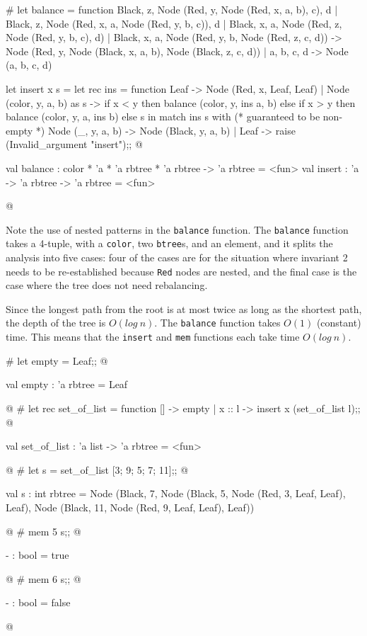 \begin{ocaml}
# let balance = function
     Black, z, Node (Red, y, Node (Red, x, a, b), c), d
   | Black, z, Node (Red, x, a, Node (Red, y, b, c)), d
   | Black, x, a, Node (Red, z, Node (Red, y, b, c), d)
   | Black, x, a, Node (Red, y, b, Node (Red, z, c, d)) ->
        Node (Red, y, Node (Black, x, a, b), Node (Black, z, c, d))
   | a, b, c, d ->
        Node (a, b, c, d)

  let insert x s =
     let rec ins = function
        Leaf -> Node (Red, x, Leaf, Leaf)
      | Node (color, y, a, b) as s ->
           if x < y then balance (color, y, ins a, b)
           else if x > y then balance (color, y, a, ins b)
           else s
     in
        match ins s with  (* guaranteed to be non-empty *)
           Node (_, y, a, b) -> Node (Black, y, a, b)
         | Leaf -> raise (Invalid_argument "insert");;
@
\begin{topoutput}
val balance : color * 'a * 'a rbtree * 'a rbtree -> 'a rbtree = <fun>
val insert : 'a -> 'a rbtree -> 'a rbtree = <fun>
\end{topoutput}
@
\end{ocaml}
\label{page:ref-black-insert}
%
Note the use of nested patterns in the \hbox{\lstinline/balance/} function.  The
\hbox{\lstinline/balance/} function takes a 4-tuple, with a \hbox{\lstinline/color/}, two
\hbox{\lstinline/btree/}s, and an element, and it splits the analysis into five
cases: four of the cases are for the situation where invariant 2 needs
to be re-established because \hbox{\lstinline/Red/} nodes are nested, and the final
case is the case where the tree does not need rebalancing.

Since the longest path from the root is at most twice as long as the
shortest path, the depth of the tree is $O(log~ n)$.  The
\hbox{\lstinline/balance/} function takes $O(1)$ (constant) time.  This means that the
\hbox{\lstinline/insert/} and \hbox{\lstinline/mem/} functions each take time $O(log~ n)$.

\begin{ocaml}
# let empty = Leaf;;
@
\begin{topoutput}
val empty : 'a rbtree = Leaf
\end{topoutput}
@
# let rec set_of_list = function
       [] -> empty
     | x :: l -> insert x (set_of_list l);;
@
\begin{topoutput}
val set_of_list : 'a list -> 'a rbtree = <fun>
\end{topoutput}
@
# let s = set_of_list [3; 9; 5; 7; 11];;
@
\begin{topoutput}
val s : int rbtree =
  Node (Black, 7, Node (Black, 5, Node (Red, 3, Leaf, Leaf), Leaf),
   Node (Black, 11, Node (Red, 9, Leaf, Leaf), Leaf))
\end{topoutput}
@
# mem 5 s;;
@
\begin{topoutput}
- : bool = true
\end{topoutput}
@
# mem 6 s;;
@
\begin{topoutput}
- : bool = false
\end{topoutput}
@
\end{ocaml}

